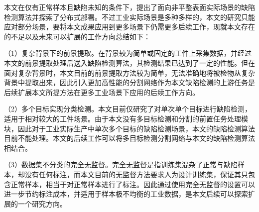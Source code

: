 \begin{conclusion}
    本文在仅有正常样本且缺陷未知的条件下，提出了面向非平整表面实际场景的缺陷检测算法并探索了分布式部署。不过工业实际场景是多种多样的，本文的研究只能应对部分场景，要将本文成果应用到更多场景下仍需更多后续工作，现就本文存在的不足以及未来可以扩展的工作方向总结如下：
    
    （1）复杂背景下的前景提取。在背景较为简单或固定的工件上采集数据，并经过本文的前景提取处理后送入缺陷检测算法，其检测结果已达到了一定的性能。但在面对复杂背景时，本文目前的前景提取方法较为简单，无法准确地将被检物从复杂背景中提取出来，因此引入更加高性能的分割网络作为本文缺陷检测的上游任务是后续扩展本文所提方法在更多工业场景下应用的后续工作方向。
    
    （2）多个目标实现分类检测。本文目前仅研究了对单次单个目标进行缺陷检测，适用于相对较大的工件场景。由于本文没有多目标检测和分割的前置任务处理模块，因此对于工业实际生产中单次多个目标的缺陷检测场景，本文的缺陷检测算法目前不能处理。本文的后续工作可以将多目标检测分割网络与本文的缺陷检测算法相结合。
    
    （3）数据集不分类的完全无监督。完全无监督是指训练集混杂了正常与缺陷样本，却没有任何标注，而本文目前的无监督方法要求人为设计训练集，保证其只包含正常样本，相当于对正常样本进行了标注。因此通过使用完全无监督的设置可以进一步节约标注成本，并适用于样本极不均衡的工业数据，是本文后续可以探索扩展的一个研究方向。
\end{conclusion}
